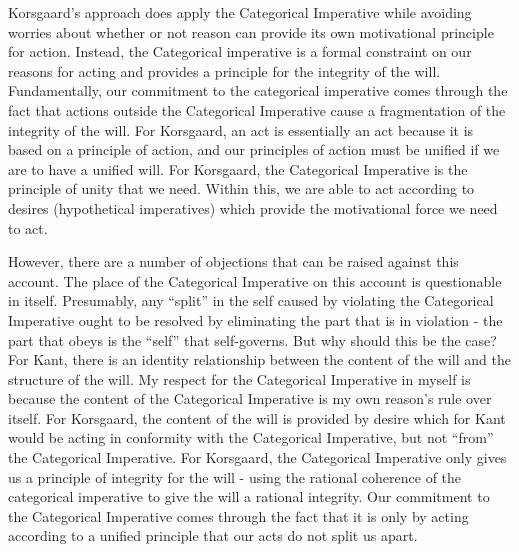 \documentclass[phd,12pt,oneside,paper=letterpaper]{ubcthesis}
\begin{document}
Korsgaard's approach does apply the Categorical Imperative while avoiding worries about whether or not reason can provide its own motivational principle for action. Instead, the Categorical imperative is a formal constraint on our reasons for acting and provides a principle for the integrity of the will. Fundamentally, our commitment to the categorical imperative comes through the fact that actions outside the Categorical Imperative cause a fragmentation of the integrity of the will. For Korsgaard, an act is essentially an act because it is based on a principle of action, and our principles of action must be unified if we are to have a unified will. For Korsgaard, the Categorical Imperative is the principle of unity that we need. Within this, we are able to act according to desires (hypothetical imperatives) which provide the motivational force we need to act. 

However, there are a number of objections that can be raised against this account. The place of the Categorical Imperative on this account is questionable in itself.  Presumably, any ``split'' in the self caused by violating the Categorical Imperative ought to be resolved by eliminating the part that is in violation - the part that obeys is the ``self'' that self-governs. But why should this be the case? For Kant, there is an identity relationship between the content of the will and the structure of the will. My respect for the Categorical Imperative in myself is because the content of the Categorical Imperative is my own reason's rule over itself. For Korsgaard, the content of the will is provided by desire which for Kant would be acting in conformity with the Categorical Imperative, but not ``from'' the Categorical Imperative.  For Korsgaard, the Categorical Imperative only gives us a principle of integrity for the will - using the rational coherence of the categorical imperative to give the will a rational integrity. Our commitment to the Categorical Imperative comes through the fact that it is only by acting according to a unified principle that our acts do not split us apart. \citep[p.179]{korsgaard2009}
\end{document}
